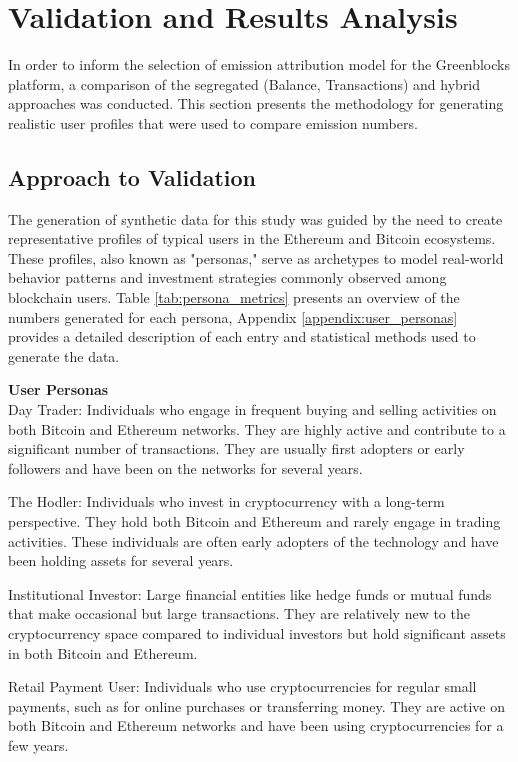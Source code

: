 \documentclass[11pt]{report}
\begin{document}
\section{Validation and Results Analysis}

In order to inform the selection of emission attribution model for the Greenblocks platform, a comparison of the segregated (Balance, Transactions) and hybrid approaches was conducted. This section presents the methodology for generating realistic user profiles that were used to compare emission numbers.

\subsection{Approach to Validation \label{sec:approach_validation}}

The generation of synthetic data for this study was guided by the need to create representative profiles of typical users in the Ethereum and Bitcoin ecosystems. These profiles, also known as "personas," serve as archetypes to model real-world behavior patterns and investment strategies commonly observed among blockchain users. Table \ref{tab:persona_metrics} presents an overview of the numbers generated for each persona, Appendix \ref{appendix:user_personas} provides a detailed description of each entry and statistical methods used to generate the data.

\textbf{User Personas} \\
Day Trader: Individuals who engage in frequent buying and selling activities on both Bitcoin and Ethereum networks. They are highly active and contribute to a significant number of transactions. They are usually first adopters or early followers and have been on the networks for several years.

The Hodler: Individuals who invest in cryptocurrency with a long-term perspective. They hold both Bitcoin and Ethereum and rarely engage in trading activities. These individuals are often early adopters of the technology and have been holding assets for several years.

Institutional Investor: Large financial entities like hedge funds or mutual funds that make occasional but large transactions. They are relatively new to the cryptocurrency space compared to individual investors but hold significant assets in both Bitcoin and Ethereum.

Retail Payment User: Individuals who use cryptocurrencies for regular small payments, such as for online purchases or transferring money. They are active on both Bitcoin and Ethereum networks and have been using cryptocurrencies for a few years.
\end{document}
